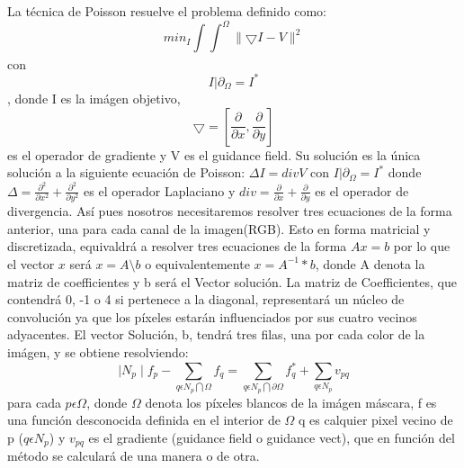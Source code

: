 \documentclass[oneside]{article}
\begin{document}
La técnica de Poisson resuelve el problema definido como: \[min_{I}\int \int_{}^{\Omega } \parallel \bigtriangledown I-V\parallel^{2}\] con \[I|\partial_{\Omega}=I^{*}\], donde
I es la imágen objetivo, \[\bigtriangledown =\left [\frac{\partial }{\partial x},\frac{\partial }{\partial y} \right ]\]
es el operador de gradiente y V es el guidance field. Su solución es la única solución a la siguiente ecuación de Poisson: \newline
$\Delta I=div V$ con $I|\partial_{\Omega}=I^{*}$ donde $\Delta=\frac{\partial^2 }{\partial x^2}+\frac{\partial^2 }{\partial y^2}$ es el operador
Laplaciano y $div=\frac{\partial }{\partial x}+\frac{\partial }{\partial y}$ es el operador de divergencia. \newline
Así pues nosotros necesitaremos resolver tres ecuaciones de la forma anterior, una para cada canal de la imagen(RGB). \newline
Esto en forma matricial y discretizada, equivaldrá a resolver tres ecuaciones de la forma $Ax=b$ por lo que el vector $x$ será $x=A\setminus b$ o equivalentemente $x=A ^{-1}*b$, donde A denota la matriz de coefficientes y b será el Vector solución. \newline
La matriz de Coefficientes, que contendrá 0, -1 o 4 si pertenece a la diagonal, representará un núcleo de convolución ya que los píxeles estarán influenciados
por sus cuatro vecinos adyacentes. \newline
El vector Solución, b, tendrá tres filas, una por cada color de la imágen, y se obtiene resolviendo:
\[\mid N_{p} \mid f_{p}-\sum_{q\epsilon N_{p}\bigcap \Omega} f_{q}=\sum_{q\epsilon N_{p}\bigcap \partial\Omega}f^{*}_{q}+\sum_{q\epsilon N_{p}}v_{pq}\]
para cada $ p \epsilon \Omega$, donde $\Omega$ denota los píxeles blancos de la imágen máscara, f es una función desconocida definida en el interior de $\Omega$
q es calquier pixel vecino de p ($q \epsilon N_{p}$) y $v_{pq}$ es el gradiente (guidance field o guidance vect), que en función del método
se calculará de una manera o de otra. \newline
\end{document}
